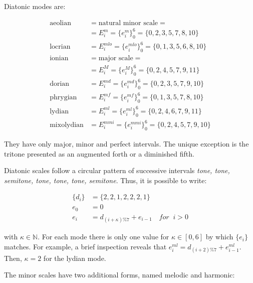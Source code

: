 Diatonic modes are:

\begin{equation}\label{eq:escalas}
\begin{split}
\text{aeolian}    & = \text{natural minor scale} = \\
                  & = E_i^m = \{e_i^m\}_0^6 = \{0,2,3,5,7,8,10\} \\
\text{locrian}    & = E_i^{mlo} = \{e_i^{mlo}\}_0^6 = \{0,1,3,5,6,8,10\} \\ 
\text{ionian}     & = \text{major scale} =  \\
                       & = E_i^M = \{e_i^M\}_0^6 = \{0,2,4,5,7,9,11\} \\
\text{dorian}     & = E_i^{md} = \{e_i^{md}\}_0^6 = \{0,2,3,5,7,9,10\} \\
\text{phrygian}   & = E_i^{mf} = \{e_i^{mf}\}_0^6 = \{0,1,3,5,7,8,10\} \\
\text{lydian}     & = E_i^{ml}=\{e_i^{ml}\}_0^6 = \{0,2,4,6,7,9,11\} \\
\text{mixolydian} & = E_i^{mmi} = \{e_i^{mmi}\}_0^6 = \{0,2,4,5,7,9,10\}
\end{split}
\end{equation}

\noindent They have only major, minor and perfect intervals.
The unique exception is the tritone presented as an augmented forth or a diminished fifth.

Diatonic scales follow a circular pattern of successive intervals \textit{tone, tone, semitone, tone, tone, tone, semitone}. Thus, it is possible to write:

\begin{equation}\label{eq:relacaoDia}
\begin{split}
\{d_i\} & =\{2,2,1,2,2,2,1\} \\
e_0 & =0 \\
e_i & =d_{(i+\kappa)\%7}+e_{i-1} \quad for \;\;  i > 0
\end{split}
\end{equation}

\noindent with $\kappa \in \mathbb{N}$. For each mode there is only one value for $\kappa \in [0,6]$ by which $\{e_i\}$ matches. 
For example, a brief inspection reveals that
$e_i^{ml}=d_{(i+2)\%7}+e_{i-1}^{ml}$. Then, $\kappa=2$ for the lydian mode.

The minor scales have two additional forms, named melodic and harmonic:

